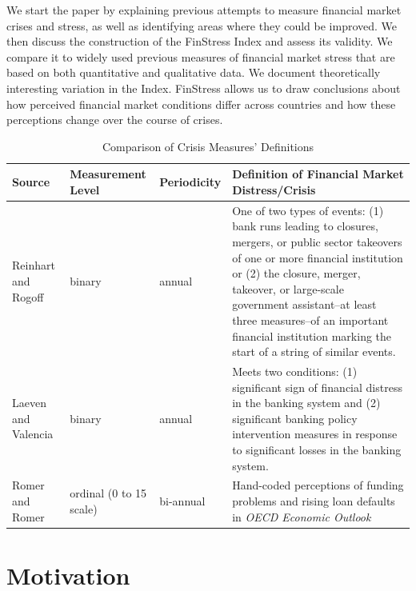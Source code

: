 \documentclass[]{article}
\begin{document}
We start the paper by explaining previous attempts to measure financial market crises and stress, as well as identifying areas where they could be improved. We then discuss the construction of the FinStress Index and assess its validity. We compare it to widely used previous measures of financial market stress that are based on both quantitative and qualitative data. We document theoretically interesting variation in the Index. FinStress allows us to draw conclusions about how perceived financial market conditions differ across countries and how these perceptions change over the course of crises.

\begin{table}
    \caption{Comparison of Crisis Measures' Definitions}
    \label{comp_table}
    \begin{center}
        \begin{tabular}{m{3cm} | m{2cm} m{2cm} m{7cm}}
            Source & Measurement Level & Periodicity &  Definition of Financial Market Distress/Crisis \\
            \hline\hline
                Reinhart and Rogoff \citeyearpar[11]{Reinhart2009,ReinhartRog2010} & binary & annual & One of two types of events: (1) bank runs leading to closures, mergers, or public sector takeovers of one or more financial institution or (2) the closure, merger, takeover, or large-scale government assistant--at least three measures--of an important financial institution marking the start of a string of similar events.  \\[1cm]
                Laeven and Valencia \citeyearpar[228]{laeven2013} & binary & annual & Meets two conditions: (1) significant sign of financial distress in the banking system and (2) significant banking policy intervention measures in response to significant losses in the banking system.  \\[1cm]
                Romer and Romer \citeyearpar[3]{Romer2015} & ordinal (0 to 15 scale) & bi-annual & Hand-coded perceptions of funding problems and rising loan defaults in \emph{OECD Economic Outlook}  \\
            \hline
        \end{tabular}
    \end{center}
\end{table}

\section{Motivation}\label{motivation}
\end{document}
